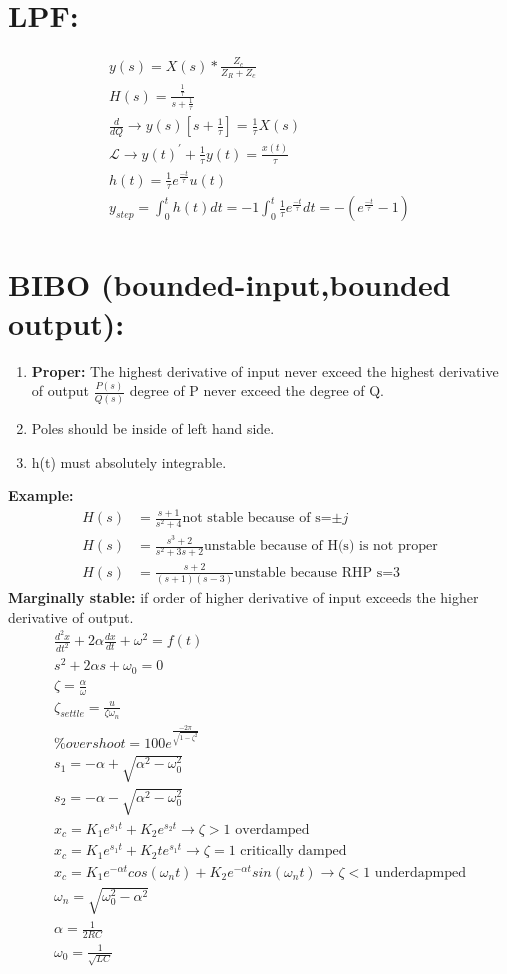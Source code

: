 \documentclass[13pt,a4paper]{article}
\begin{document}
\section{LPF: }
\begin{gather*}
    y(s)=X(s)*\frac{Z_c}{Z_R+Z_c}\\
    H(s)=\frac{\frac{1}{\tau}}{s+\frac{1}{\tau}}\\
    \frac{d}{dQ}\rightarrow y(s)[s+\frac{1}{\tau}]=\frac{1}{\tau}X(s)\\
    \mathscr{L}\rightarrow y(t)^{'}+\frac{1}{\tau}y(t)=\frac{x(t)}{\tau}\\
    h(t)=\frac{1}{\tau}e^{\frac{-t}{\tau}}u(t)\\
    y_{step}=\int_0^th(t)dt=-1\int_0^t\frac{1}{\tau}e^{\frac{-t}{\tau}}dt =-(e^{\frac{-t}{\tau}}-1)
\end{gather*}
\section{BIBO (bounded-input,bounded output):}
\begin{enumerate}
    \item \textbf{Proper: }The highest derivative of input never exceed the highest derivative of output $\frac{P(s)}{Q(s)}$ degree of P never exceed the degree of Q.
    \item Poles should be inside of left hand side.
    \item h(t) must absolutely integrable.
\end{enumerate}
\textbf{Example:}
\begin{align*}
    H(s) &=\frac{s+1}{s^2+4} \text{not stable because of s=$\pm j$}\\
    H(s) &=\frac{s^3+2}{s^2+3s+2} \text{unstable because of H(s) is not proper}\\
    H(s) &=\frac{s+2}{(s+1)(s-3)}\text{unstable because RHP s=3}
\end{align*}
\textbf{Marginally stable: } if order of higher derivative of input exceeds the higher derivative of output.
\begin{gather*}
	\frac{d^2x}{dt^2}+2\alpha \frac{dx}{dt}+\omega^2=f(t)\\
	s^2+2\alpha s+\omega_0=0\\
	\zeta =\frac{\alpha}{\omega}\\
	\zeta_{settle}= \frac{u}{\zeta\omega_n}\\
	\% overshoot=100 e^{\frac{-2\pi}{\sqrt{1-\zeta^2}}}\\
	s_1=-\alpha+\sqrt{\alpha^2-\omega_0 ^2}\\
	s_2=-\alpha-\sqrt{\alpha^2-\omega_0 ^2}\\
	x_c=K_1e^{s_1t}+K_2e^{s_2t}\rightarrow \zeta>1\text{ overdamped}\\
	x_c=K_1e^{s_1t}+K_2te^{s_1t}\rightarrow \zeta=1\text{ critically damped}\\
	x_c=K_1e^{-\alpha t}cos(\omega_n t)+K_2e^{-\alpha t}sin(\omega _n t)\rightarrow \zeta<1 \text{ underdapmped}\\
	\omega _n=\sqrt{\omega _0^2-\alpha^2}\\
	\alpha=\frac{1}{2RC}\\
	\omega _0=\frac{1}{\sqrt{LC}}
\end{gather*}
\end{document}
